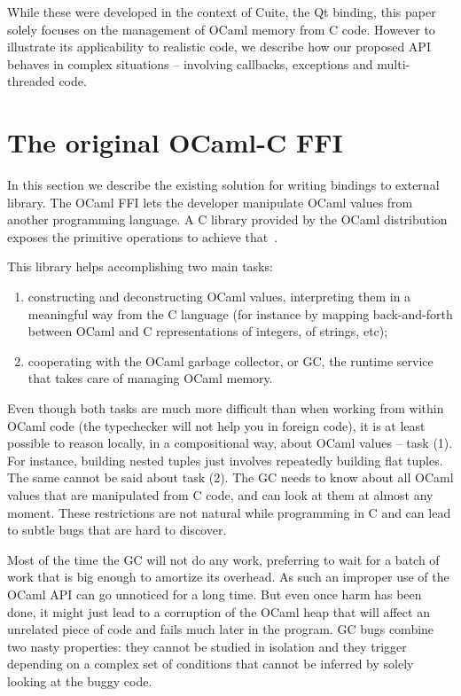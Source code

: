 \documentclass[a4paper]{easychair}
\begin{document}
While these were developed in the context of Cuite, the Qt binding, this
paper solely focuses on the management of OCaml memory from C code.
However to illustrate its applicability to realistic code, we describe
how our proposed API behaves in complex situations -- involving
callbacks, exceptions and multi-threaded code.

\section{The original OCaml-C FFI}

In this section we describe the existing solution for writing bindings to
external library.  The OCaml FFI lets the developer manipulate OCaml values
from another programming language. A C library provided by the OCaml
distribution exposes the primitive operations to achieve that~\citep{harmony}.

This library helps accomplishing two main tasks:

\begin{enumerate}
\item constructing and deconstructing OCaml values, interpreting them in a
      meaningful way from the C language (for instance by mapping
      back-and-forth between OCaml and C representations of integers, of
      strings, etc);
\item cooperating with the OCaml garbage collector, or GC, the runtime
      service that takes care of managing OCaml memory.
\end{enumerate}

Even though both tasks are much more difficult than when working from
within OCaml code (the typechecker will not help you in foreign code),
it is at least possible to reason locally, in a compositional way, about
OCaml values -- task (1). For instance, building nested tuples just
involves repeatedly building flat tuples.
The same cannot be said about task (2). The GC needs to know about all
OCaml values that are manipulated from C code, and can look at them at
almost any moment. These restrictions are not natural while programming
in C and can lead to subtle bugs that are hard to discover.

Most of the time the GC will not do any work, preferring to wait for a
batch of work that is big enough to amortize its overhead. As such an
improper use of the OCaml API can go unnoticed for a long time. But even
once harm has been done, it might just lead to a corruption of the OCaml
heap that will affect an unrelated piece of code and fails much later in the
program.  GC bugs combine two nasty properties: they cannot be studied in
isolation and they trigger depending on a complex set of conditions that
cannot be inferred by solely looking at the buggy code.
\end{document}
